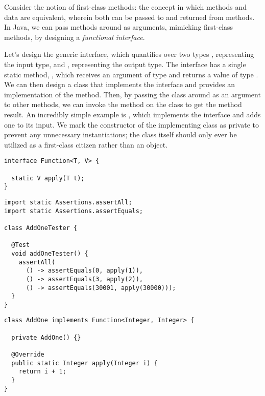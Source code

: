 Consider the notion of first-class methods: the concept in which methods and data are equivalent, wherein both can be passed to and returned from methods. In Java, we can pass methods around as arguments, mimicking first-class methods, by designing a \emph{functional interface}.

Let's design the generic  interface, which quantifies over two types , representing the input type, and , representing the output type. 
The  interface has a single static method, , which receives an argument of type  and returns a value of type . 
We can then design a class that implements the  interface and provides an implementation of the  method. 
Then, by passing the class around as an argument to other methods, we can invoke the  method on the class to get the method result.
An incredibly simple example is , which implements the  interface and adds one to its input. 
We mark the constructor of the implementing class as private to prevent any unnecessary instantiations; the class itself should only ever be utilized as a first-class citizen rather than an object.

\begin{lstlisting}[language=MyJava]
interface Function<T, V> {

  static V apply(T t); 
}
\end{lstlisting}

\begin{lstlisting}[language=MyJava]
import static Assertions.assertAll;
import static Assertions.assertEquals;

class AddOneTester {

  @Test
  void addOneTester() {
    assertAll(
      () -> assertEquals(0, apply(1)),
      () -> assertEquals(3, apply(2)),
      () -> assertEquals(30001, apply(30000)));
  }
}
\end{lstlisting}
\begin{lstlisting}[language=MyJava]
class AddOne implements Function<Integer, Integer> {

  private AddOne() {}

  @Override
  public static Integer apply(Integer i) { 
    return i + 1; 
  }
}
\end{lstlisting}

